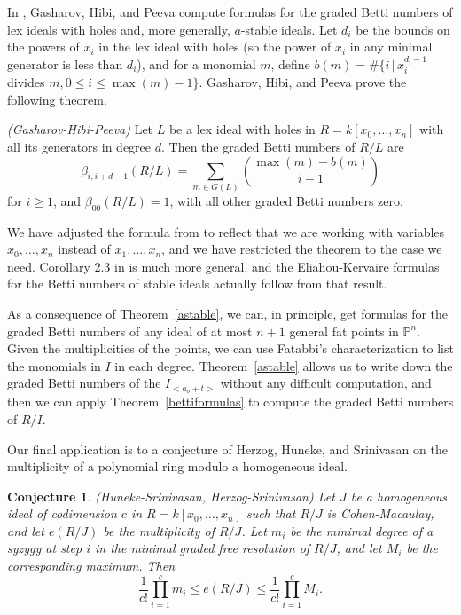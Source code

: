 \documentclass{article}
\begin{document}
In \cite{GHP}, Gasharov, Hibi, and Peeva compute formulas for the graded Betti numbers of lex ideals with holes and, more generally, {\boldmath $a$}-stable ideals. Let $d_i$ be the bounds on the powers of $x_i$ in the lex ideal with holes (so the power of $x_i$ in any minimal generator is less than $d_i$), and for a monomial $m$, define $b(m)=\#\{i \, | \, x_i^{d_i-1}$ divides $m, 0 \le i \le \max(m)-1 \}$. Gasharov, Hibi, and Peeva prove the following theorem.

\begin{theorem}
\label{astable}
\emph{(Gasharov-Hibi-Peeva)} Let $L$ be a lex ideal with holes in $R=k[x_0,\dots,x_n]$ with all its generators in degree $d$. Then the graded Betti numbers of $R/L$ are \[ \beta_{i,i+d-1}(R/L) = \sum_{m \in G(L)} {\max(m)-b(m) \choose i-1} \] for $i \ge 1$, and $\beta_{00}(R/L)=1$, with all other graded Betti numbers zero.
\end{theorem}

We have adjusted the formula from \cite{GHP} to reflect that we are working with variables $x_0,\dots,x_n$ instead of $x_1,\dots,x_n$, and we have restricted the theorem to the case we need. Corollary 2.3 in \cite{GHP} is much more general, and the Eliahou-Kervaire formulas for the Betti numbers of stable ideals actually follow from that result.

As a consequence of Theorem~\ref{astable}, we can, in principle, get formulas for the graded Betti numbers of any ideal of at most $n+1$ general fat points in $\mathbb P^n$. Given the multiplicities of the points, we can use Fatabbi's characterization to list the monomials in $I$ in each degree. Theorem~\ref{astable} allows us to write down the graded Betti numbers of the $I_{<a_o+t>}$ without any difficult computation, and then we can apply Theorem~\ref{bettiformulas} to compute the graded Betti numbers of $R/I$.

Our final application is to a conjecture of Herzog, Huneke, and Srinivasan on the multiplicity of a polynomial ring modulo a homogeneous ideal. 

\newtheorem{conjecture}[definition]{Conjecture}
\begin{conjecture}
\label{multconj}
\emph{(Huneke-Srinivasan, Herzog-Srinivasan)} Let $J$ be a homogeneous ideal of codimension $c$ in $R=k[x_0,\dots,x_n]$ such that $R/J$ is Cohen-Macaulay, and let $e(R/J)$ be the multiplicity of $R/J$. Let $m_i$ be the minimal degree of a syzygy at step $i$ in the minimal graded free resolution of $R/J$, and let $M_i$ be the corresponding maximum. Then \[ \frac{1}{c!} \prod_{i=1}^c m_i \le e(R/J) \le \frac{1}{c!} \prod_{i=1}^c M_i.\]
\end{conjecture}
\end{document}
